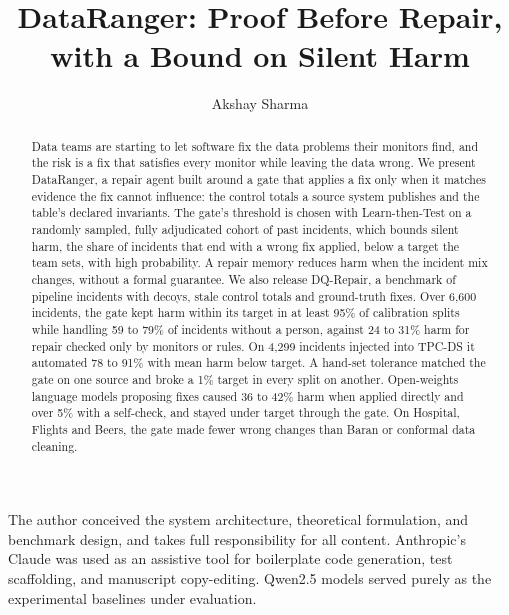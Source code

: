 \documentclass[sigconf, nonacm]{acmart}
\begin{document}
\title{DataRanger: Proof Before Repair, with a Bound on Silent Harm}

\author{Akshay Sharma}

\begin{abstract}
Data teams are starting to let software fix the data problems their monitors find, and the risk is a fix that satisfies every monitor while leaving the data wrong. We present DataRanger, a repair agent built around a gate that applies a fix only when it matches evidence the fix cannot influence: the control totals a source system publishes and the table's declared invariants. The gate's threshold is chosen with Learn-then-Test on a randomly sampled, fully adjudicated cohort of past incidents, which bounds silent harm, the share of incidents that end with a wrong fix applied, below a target the team sets, with high probability. A repair memory reduces harm when the incident mix changes, without a formal guarantee. We also release DQ-Repair, a benchmark of pipeline incidents with decoys, stale control totals and ground-truth fixes. Over 6,600 incidents, the gate kept harm within its target in at least 95\% of calibration splits while handling 59 to 79\% of incidents without a person, against 24 to 31\% harm for repair checked only by monitors or rules. On 4,299 incidents injected into TPC-DS it automated 78 to 91\% with mean harm below target. A hand-set tolerance matched the gate on one source and broke a 1\% target in every split on another. Open-weights language models proposing fixes caused 36 to 42\% harm when applied directly and over 5\% with a self-check, and stayed under target through the gate. On Hospital, Flights and Beers, the gate made fewer wrong changes than Baran or conformal data cleaning.
\end{abstract}

\maketitle
\vldbtopmatter






\begin{acks}
The author conceived the system architecture, theoretical formulation, and benchmark design, and takes full responsibility for all content. Anthropic's Claude was used as an assistive tool for boilerplate code generation, test scaffolding, and manuscript copy-editing. Qwen2.5 models served purely as the experimental baselines under evaluation.
\end{acks}



\end{document}
